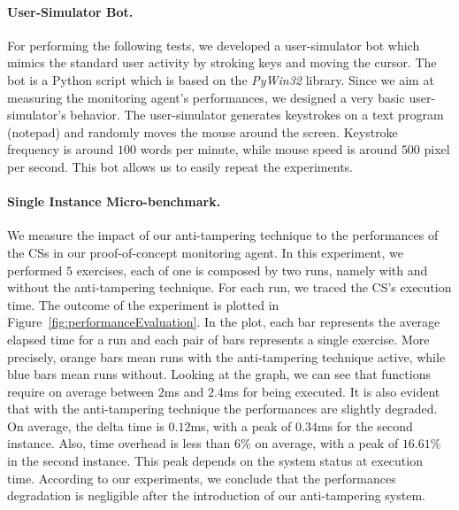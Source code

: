 \paragraph{User-Simulator Bot.}
For performing the following tests, we developed a user-simulator bot which 
mimics the standard user activity by stroking keys and moving the cursor.
The bot is a Python script which is based on the \emph{PyWin32} library. %
Since we aim at measuring the monitoring agent's performances, we designed a 
very basic user-simulator's behavior.
The user-simulator generates keystrokes on a text program (\ie notepad) and 
randomly moves the mouse around the screen.
Keystroke frequency is around $100$ words per minute, while mouse speed is 
around $500$ pixel per second.
This bot allows us to easily repeat the experiments.

\paragraph{Single Instance Micro-benchmark.}
We measure the impact of our anti-tampering technique to the performances of 
the CSs in our proof-of-concept monitoring agent.
In this experiment, we performed $5$ exercises, each of one is composed by two 
runs, namely with and without the anti-tampering technique.
For each run, we traced the CS's execution time.
The outcome of the experiment is plotted in 
Figure~\ref{fig:performanceEvaluation}. %
In the plot, each bar represents the average elapsed time for a run and each 
pair of bars represents a single exercise. More precisely, orange bars
mean runs with the anti-tampering technique active, while blue bars mean runs 
without.
Looking at the graph, we can see that functions require on average between 
$2$ms and $2.4$ms for being executed.
It is also evident that with the anti-tampering technique the performances are 
slightly degraded.
On average, the delta time is $0.12$ms, with a peak of $0.34$ms for the second 
instance. 
Also, time overhead is less than $6\%$ on average, with a peak of $16.61\%$ in 
the second instance. 
This peak depends on the system status at execution time.
According to our experiments, we conclude that the performances degradation is 
negligible after the introduction of our anti-tampering system.

